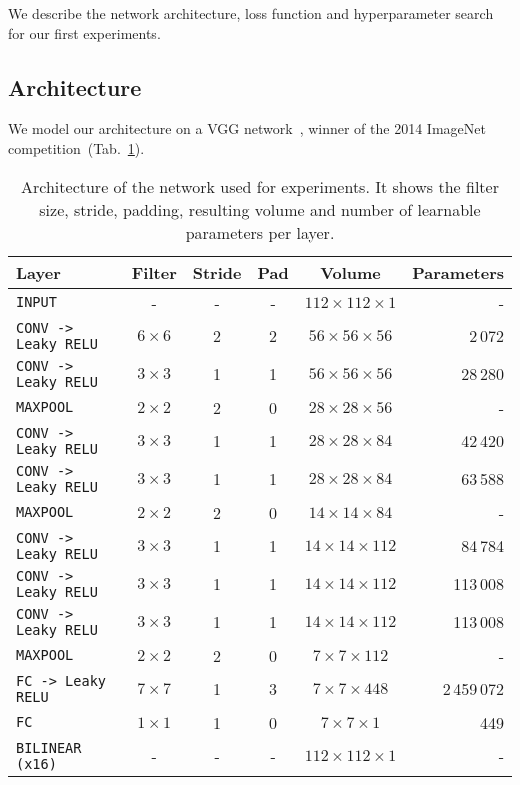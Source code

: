 We describe the network architecture, loss function and hyperparameter search for our first experiments.

\subsection{Architecture}
\label{subsec:Architecture1}
We model our architecture on a VGG network~\cite{Simonyan2014}, winner of the 2014 ImageNet competition~(Tab.~\ref{tab:convNetArchitecture1}).
\begin{table}[h]
	\centering
	\begin{tabular}{lccccr}
	\hline
	\textbf{Layer} & \textbf{Filter} & \textbf{Stride} &\textbf{Pad} & \textbf{Volume} & \textbf{Parameters} \\
	\hline
	\texttt{INPUT}	& -	& - & - & $112 \times 112 \times 1$ & -\\
	\texttt{CONV -> Leaky RELU} & $6 \times 6$ & 2 & 2 & $56 \times 56 \times 56$ & 2\,072\\
	\texttt{CONV -> Leaky RELU} & $3 \times 3$ & 1 & 1 & $56 \times 56 \times 56$ & 28\,280\\
	\texttt{MAXPOOL} & $2 \times 2$ & 2 & 0 & $28 \times 28 \times 56$ & -\\
	\texttt{CONV -> Leaky RELU} & $3 \times 3$ & 1 & 1 & $28 \times 28 \times 84$ & 42\,420\\
	\texttt{CONV -> Leaky RELU} & $3 \times 3$ & 1 & 1 & $28 \times 28 \times 84$ & 63\,588\\
	\texttt{MAXPOOL} & $2 \times 2$ & 2 & 0 & $14 \times 14 \times 84$ & -\\
	\texttt{CONV -> Leaky RELU} & $3 \times 3$ & 1 & 1 & $14 \times 14 \times 112$ & 84\,784\\
	\texttt{CONV -> Leaky RELU} & $3 \times 3$ & 1 & 1 & $14 \times 14 \times 112$ & 113\,008\\
	\texttt{CONV -> Leaky RELU} & $3 \times 3$ & 1 & 1 & $14 \times 14 \times 112$ & 113\,008\\
	\texttt{MAXPOOL} & $2 \times 2$ & 2 & 0 & $7 \times 7 \times 112$ & -\\
	\texttt{FC -> Leaky RELU} & $7 \times 7$ & 1 & 3 & $7 \times 7 \times 448$ & 2\,459\,072\\
	\texttt{FC} & $1 \times 1$ & 1 & 0 & $7 \times 7 \times 1$ & 449 \\
	\texttt{BILINEAR (x16)} & - & - & - & $112 \times 112 \times 1$ & -\\
	\hline
	\end{tabular}
	\caption[Selected convolutional network architecture]{Architecture of the network used for experiments. It shows the filter size, stride, padding, resulting volume and number of learnable parameters per layer.}
	\label{tab:convNetArchitecture1}
\end{table}

